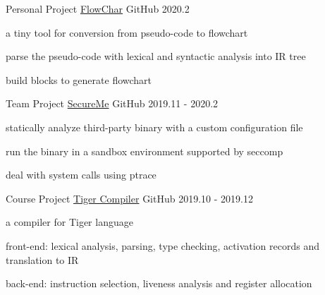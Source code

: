 
\begin{cventries}
  
  \cventry
    {Personal Project} %
    {\href{https://github.com/Gusabary/FlowChar}{FlowChar}} %
    {GitHub} %
    {2020.2} %
    {
      \begin{cvitems} %
        \item a tiny tool for conversion from pseudo-code to flowchart
        \item parse the pseudo-code with lexical and syntactic analysis into IR tree
        \item build blocks to generate flowchart
      \end{cvitems}
    }

  \cventry
    {Team Project} %
    {\href{https://github.com/Veiasai/secureMe}{SecureMe}} %
    {GitHub} %
    {2019.11 - 2020.2} %
    {
      \begin{cvitems} %
        \item statically analyze third-party binary with a custom configuration file
        \item run the binary in a sandbox environment supported by seccomp
        \item deal with system calls using ptrace
      \end{cvitems}
    }

  \cventry
    {Course Project} %
    {\href{https://github.com/Gusabary/Junior/tree/master/Compilers/lab-5\%266}{Tiger Compiler}} %
    {GitHub} %
    {2019.10 - 2019.12} %
    {
      \begin{cvitems} %
        \item a compiler for Tiger language
        \item front-end: lexical analysis, parsing, type checking, activation records and translation to IR
        \item back-end: instruction selection, liveness analysis and register allocation
      \end{cvitems}
    }


\end{cventries}
